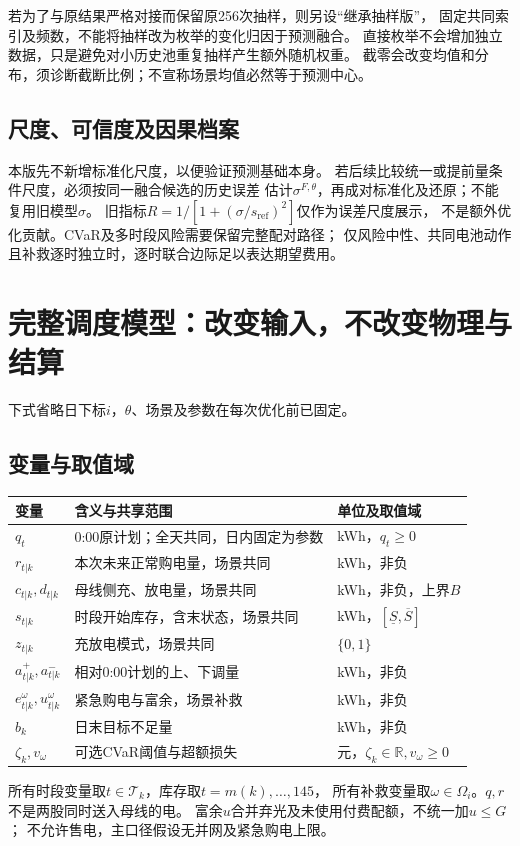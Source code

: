 \documentclass[UTF8,11pt]{ctexart}
\newcommand{\R}{\mathbb R}
\begin{document}
若为了与原结果严格对接而保留原256次抽样，则另设“继承抽样版”，
固定共同索引及频数，不能将抽样改为枚举的变化归因于预测融合。
直接枚举不会增加独立数据，只是避免对小历史池重复抽样产生额外随机权重。
截零会改变均值和分布，须诊断截断比例；不宣称场景均值必然等于预测中心。

\subsection{尺度、可信度及因果档案}
本版先不新增标准化尺度，以便验证预测基础本身。
若后续比较统一或提前量条件尺度，必须按同一融合候选的历史误差
估计$\sigma^{F,\theta}$，再成对标准化及还原；不能复用旧模型$\sigma$。
旧指标$R=1/[1+(\sigma/s_{\mathrm{ref}})^2]$仅作为误差尺度展示，
不是额外优化贡献。CVaR及多时段风险需要保留完整配对路径；
仅风险中性、共同电池动作且补救逐时独立时，逐时联合边际足以表达期望费用。

\section{完整调度模型：改变输入，不改变物理与结算}
下式省略日下标$i$，$\theta$、场景及参数在每次优化前已固定。
\subsection{变量与取值域}
\begin{longtable}{p{3.1cm}p{6.0cm}p{4.7cm}}
\toprule 变量 & 含义与共享范围 & 单位及取值域\\ \midrule
\endhead
$q_t$ & 0:00原计划；全天共同，日内固定为参数 & kWh，$q_t\geq0$\\
$r_{t|k}$ & 本次未来正常购电量，场景共同 & kWh，非负\\
$c_{t|k},d_{t|k}$ & 母线侧充、放电量，场景共同 & kWh，非负，上界$B$\\
$s_{t|k}$ & 时段开始库存，含末状态，场景共同 & kWh，$[\underline S,\overline S]$\\
$z_{t|k}$ & 充放电模式，场景共同 & $\{0,1\}$\\
$a^+_{t|k},a^-_{t|k}$ & 相对0:00计划的上、下调量 & kWh，非负\\
$e^\omega_{t|k},u^\omega_{t|k}$ & 紧急购电与富余，场景补救 & kWh，非负\\
$b_k$ & 日末目标不足量 & kWh，非负\\
$\zeta_k,v_\omega$ & 可选CVaR阈值与超额损失 & 元，$\zeta_k\in\R,v_\omega\geq0$\\
\bottomrule
\end{longtable}
所有时段变量取$t\in\mathcal T_k$，库存取$t=m(k),\ldots,145$，
所有补救变量取$\omega\in\Omega_i$。$q,r$不是两股同时送入母线的电。
富余$u$合并弃光及未使用付费配额，不统一加$u\leq G$；
不允许售电，主口径假设无并网及紧急购电上限。
\end{document}
